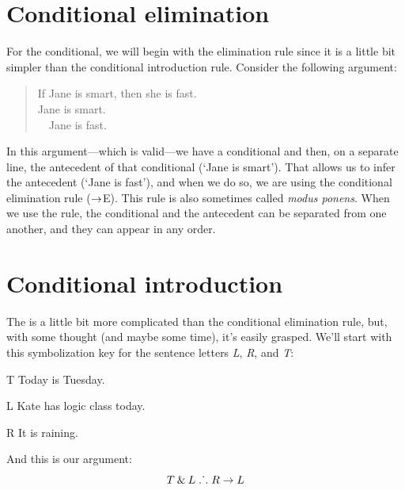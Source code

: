 \section{Conditional elimination}

For the conditional, we will begin with the elimination rule since it is a little bit simpler than the conditional introduction rule. Consider the following argument:
	\begin{quote}
		If Jane is smart, then she is fast.\\
		Jane is smart.\\ 
		\therefore~~Jane is fast.
	\end{quote}
In this argument---which is valid---we have a conditional and then, on a separate line, the antecedent of that conditional (`Jane is smart'). That allows us to infer the antecedent (`Jane is fast'), and when we do so, we are using the conditional elimination rule ($\rightarrow$E).
This rule is also sometimes called \emph{modus ponens}. When we use the rule, the conditional and the antecedent can be separated from one another, and they can appear in any order.


\section{Conditional introduction}

The  is a little bit more complicated than the conditional elimination rule, but, with some thought (and maybe some time), it's easily grasped. We'll start with this symbolization key for the sentence letters \textit{L}, \textit{R}, and \textit{T}:
	\begin{ekey}
		\item[T] Today is Tuesday.
		\item[L] Kate has logic class today.
		\item[R] It is raining.
	\end{ekey}
And this is our argument: 
$$T \mathbin{\&} L \mathrel{\ldotp\dot{}\,\ldotp} R \rightarrow L$$
 
